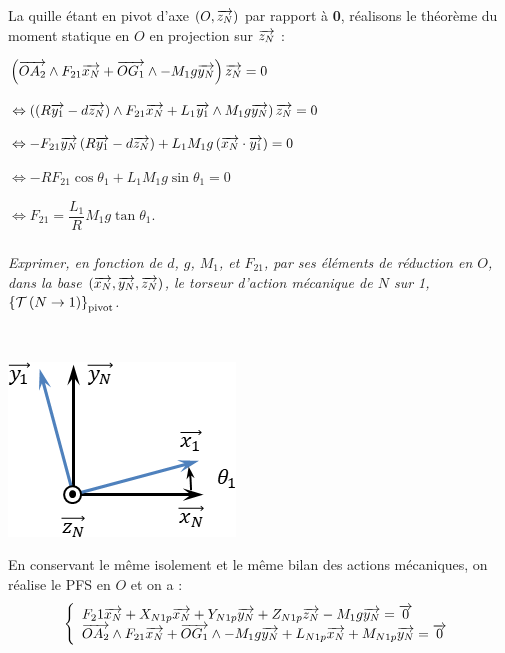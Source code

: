 \documentclass[10pt,fleqn]{article} %
\begin{document}
\begin{multicols}{2}
\begin{corrige}
La quille étant en pivot d'axe $\left(O,\overrightarrow{z_N}\right)$ par rapport à \textbf{0}, réalisons le théorème du moment statique en $O$ en projection sur $\overrightarrow{z_N}$ :

\noindent
$\left(\overrightarrow{OA_2}\wedge F_{21}\overrightarrow{x_N}  + 
\overrightarrow{OG_1}\wedge -M_1g\overrightarrow{y_N} \right) \overrightarrow{z_N} = {0}$ 

\noindent
$\Leftrightarrow  \left(\left( R\overrightarrow{y_1} - d\overrightarrow{z_N}\right)\wedge F_{21}\overrightarrow{x_N}  
+L_1\overrightarrow{y_1}\wedge M_1g\overrightarrow{y_N} \right) \overrightarrow{z_N} = {0}$

\noindent
$\Leftrightarrow 
-F_{21}\overrightarrow{y_N}\left( R\overrightarrow{y_1} - d\overrightarrow{z_N}\right)  
+L_1 M_1g\left(\overrightarrow{x_N} \cdot \overrightarrow{y_1}\right) = {0}$
\noindent

\noindent
$\Leftrightarrow 
-RF_{21}\cos \theta_1
+L_1 M_1g\sin\theta_1 = {0}$

\noindent
$\Leftrightarrow F_{21}=\dfrac{L_1}{R} M_1g\tan\theta_1 $.

\end{corrige}
\else
\fi

\subparagraph{}\textit{Exprimer, en fonction de $d$, $g$,
$M_1$, et $F_{21}$, par ses éléments de réduction en $O$, dans la base $\left( \overrightarrow{x_N} , \overrightarrow{y_N} , \overrightarrow{z_N} \right)$, le torseur d’action mécanique de $N$
sur 1, $\left\{\mathcal{T} \left(N\rightarrow 1 \right) \right\}_{\text{pivot}}$.}
\ifprof
\begin{corrige} ~\\

\begin{center}
\includegraphics[width=.5\linewidth]{images/cor_02}
\end{center}


En conservant le même isolement et le même bilan des actions mécaniques, on réalise le PFS en $O$ et on a : 
$$
\left\{
\begin{array}{l}
F_21\overrightarrow{x_N}+X_{N1p}\overrightarrow{x_N}+Y_{N1p}\overrightarrow{y_N}+Z_{N1p}\overrightarrow{z_N} - M_1g\overrightarrow{y_N} = \overrightarrow{0}\\
\overrightarrow{OA_2}\wedge F_{21}\overrightarrow{x_N}  + 
\overrightarrow{OG_1}\wedge -M_1g\overrightarrow{y_N}  +L_{N1p}\overrightarrow{x_N}+M_{N1p}\overrightarrow{y_N}= \overrightarrow{0} \\
\end{array}
\right.
$$




\end{corrige}
\end{multicols}
\end{document}
